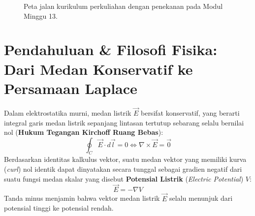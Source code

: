 \documentclass[11pt,a4paper]{article}
\theoremstyle{definition}
\begin{document}
\begin{figure}[htbp]
{%
}
\caption{Peta jalan kurikulum perkuliahan dengan penekanan pada Modul Minggu 13.}
\label{fig:peta_jalan_pd_w13}
\end{figure}

\section{Pendahuluan \& Filosofi Fisika: Dari Medan Konservatif ke Persamaan Laplace}

Dalam elektrostatika murni, medan listrik $\vec{E}$ bersifat konservatif, yang berarti integral garis medan listrik sepanjang lintasan tertutup sebarang selalu bernilai nol (\textbf{Hukum Tegangan Kirchoff Ruang Bebas}):
\begin{equation}
    \oint_C \vec{E} \cdot d\vec{l} = 0 \iff \nabla \times \vec{E} = \vec{0}
    \label{eq:conservative_e}
\end{equation}
Berdasarkan identitas kalkulus vektor, suatu medan vektor yang memiliki kurva (\textit{curl}) nol identik dapat dinyatakan secara tunggal sebagai gradien negatif dari suatu fungsi medan skalar yang disebut \textbf{Potensial Listrik} (\textit{Electric Potential}) $V$:
\begin{equation}
    \vec{E} = -\nabla V
    \label{eq:e_grad_v}
\end{equation}
Tanda minus menjamin bahwa vektor medan listrik $\vec{E}$ selalu menunjuk dari potensial tinggi ke potensial rendah.
\end{document}
